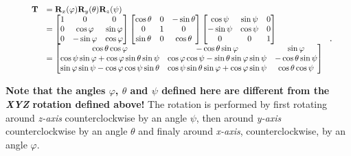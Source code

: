         \begin{equation}
            \scalebox{0.85}{
                $ \begin{array}{ll}
                    \mathbf{T}
                    &= \mathbf{R}_{x}(\varphi)\mathbf{R}_{y}(\theta)\mathbf{R}_{z}(\psi) \\
                    &=
                    \begin{bmatrix}
                        1 & 0 & 0 \\
                        0 & \cos \varphi & \sin \varphi \\
                        0 & -\sin \varphi & \cos \varphi
                    \end{bmatrix}
                    \begin{bmatrix}
                        \cos \theta & 0 & -\sin \theta \\
                        0 & 1 & 0 \\
                        \sin \theta & 0 & \cos \theta
                    \end{bmatrix}
                    \begin{bmatrix}
                        \cos \psi & \sin \psi & 0 \\
                        -\sin \psi & \cos \psi & 0 \\
                        0 & 0 & 1
                    \end{bmatrix} \\
                    &=
                    \begin{bmatrix}
                        \cos \theta \cos \varphi
                        & - \cos \theta \sin \varphi
                        & \sin \varphi \\
                        \cos \psi \sin \varphi + \cos \varphi \sin \theta \sin \psi
                        & \cos \varphi \cos \psi - \sin \theta \sin \varphi \sin \psi
                        & -\cos \theta \sin \psi \\
                        \sin \varphi \sin \psi - \cos \varphi \cos \psi \sin \theta
                        & \cos \psi \sin \theta \sin \varphi + \cos \varphi \sin \psi
                        & \cos \theta \cos \psi
                    \end{bmatrix}
                \end{array} $
            }
        .\end{equation}

        \textbf{Note that the angles $\varphi$, $\theta$ and $\psi$ defined here are
        different from the \textit{XYZ} rotation defined above!} The rotation
        is performed by first rotating around \textit{z-axis} counterclockwise
        by an angle $\psi$, then around \textit{y-axis} counterclockwise
        by an angle $\theta$ and finaly around \textit{x-axis}, counterclockwise,
        by an angle $\varphi$.


